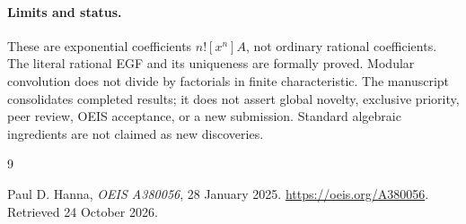\documentclass[11pt,a4paper]{article}
\theoremstyle{remark}
\begin{document}
\paragraph{Limits and status.}
These are exponential coefficients $n![x^n]A$, not ordinary rational coefficients. The literal rational EGF and its uniqueness are formally proved. Modular convolution does not divide by factorials in finite characteristic.
The manuscript consolidates completed results; it does not assert global
novelty, exclusive priority, peer review, OEIS acceptance, or a new submission.
Standard algebraic ingredients are not claimed as new discoveries.

\begin{thebibliography}{9}
\raggedright
{}
Paul D. Hanna, \emph{OEIS A380056}, 28 January 2025.
\url{https://oeis.org/A380056}. Retrieved 24 October 2026.
\end{thebibliography}
\end{document}
